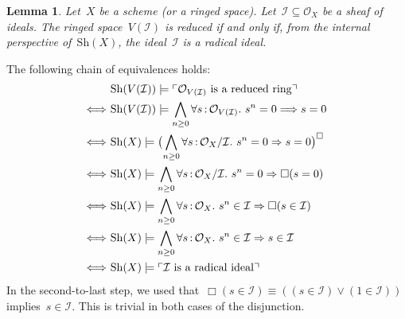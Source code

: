 \documentclass[10pt,reqno,a4paper]{amsbook}
\makeatletter
\theoremstyle{definition}
\theoremstyle{plain}
\newtheorem{lemma}[defn]{Lemma}
\theoremstyle{remark}
\renewcommand{\O}{\mathcal{O}}
\newcommand{\I}{\mathcal{I}}
\newcommand{\Sh}{\mathrm{Sh}}
\newcommand{\?}{\,{:}\,}
\renewcommand{\_}{\mathpunct{.}\,}
\newcommand{\speak}[1]{\ulcorner\text{\textnormal{#1}}\urcorner}
\renewenvironment{proof}[1][\proofname]{\par
  \pushQED{\qed}%
  \normalfont \topsep6\p@\@plus6\p@\relax
  \trivlist
  \item[\hskip\labelsep
        \itshape
    #1\@addpunct{.}]\ignorespaces
}{%
  \popQED\endtrivlist\@endpefalse
}
\makeatother
\begin{document}
\begin{lemma}\label{lemma:closed-subspace-reduced}
Let~$X$ be a scheme (or a ringed space). Let~$\I \subseteq \O_X$ be
a sheaf of ideals. The ringed space~$V(\I)$ is reduced if and only if, from the
internal perspective of~$\Sh(X)$, the ideal~$\I$ is a radical ideal.\end{lemma}
\begin{proof}The following chain of equivalences holds:
\begin{align*}
  &\ \Sh(V(\I)) \models \speak{$\O_{V(\I)}$ is a reduced ring} \\
  \Longleftrightarrow&\
    \Sh(V(\I)) \models \bigwedge_{n \geq 0} \forall s\?\O_{V(\I)}\_
      s^n = 0 \Longrightarrow s = 0 \\
  \Longleftrightarrow&\
    \Sh(X) \models \bigl(\bigwedge_{n \geq 0} \forall s\?\O_X/\I\_ s^n = 0
    \Rightarrow s = 0\bigr)^\Box \\
  \Longleftrightarrow&\
    \Sh(X) \models \bigwedge_{n \geq 0} \forall s\?\O_X/\I\_ s^n = 0 \Rightarrow \Box(s = 0) \\
  \Longleftrightarrow&\
    \Sh(X) \models \bigwedge_{n \geq 0} \forall s\?\O_X\_ s^n \in \I
    \Rightarrow \Box(s \in \I) \\
  \Longleftrightarrow&\
    \Sh(X) \models \bigwedge_{n \geq 0} \forall s\?\O_X\_ s^n \in \I
    \Rightarrow s \in \I \\
  \Longleftrightarrow&\
    \Sh(X) \models \speak{$\I$ is a radical ideal}
\end{align*}
In the second-to-last step, we used that~$\Box(s \in \I) \equiv ((s \in \I) \vee
(1 \in \I))$ implies~$s \in \I$. This is trivial in both cases of the
disjunction.
\end{proof}
\end{document}
